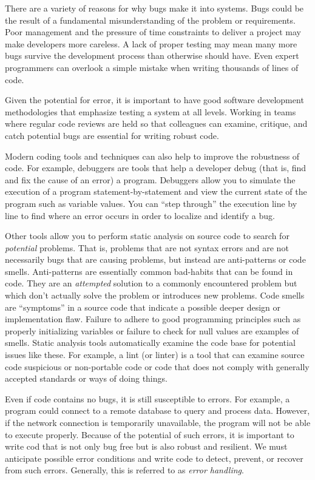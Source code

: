 There are a variety of reasons for why bugs make it into systems.
Bugs could be the result of a fundamental misunderstanding of
the problem or requirements.  Poor management and
the pressure of time constraints to deliver a project may make
developers more careless.  A lack of proper testing may mean
many more bugs survive the development process than otherwise
should have.  Even expert programmers can overlook a simple
mistake when writing thousands of lines of code.  

Given the potential for error, it is important to have good software development
methodologies that emphasize testing a system at all levels.
Working in teams where regular code reviews are held so that
colleagues can examine, critique, and catch potential bugs
are essential for writing robust code.

Modern coding tools and techniques can also help to improve
the robustness of code.  For example, 
\glspl{debugger} are 
tools that help a developer \gls{debug} (that is, find and fix
the cause of an error) a program.  Debuggers 
allow you to simulate the execution of a program statement-by-statement 
and view the current state of the program such
as variable values.  You can ``step through'' the execution
line by line to find where an error occurs in order to localize
and identify a bug.

Other tools allow you to perform \gls{static analysis} on 
source code to search for \emph{potential} problems.  
That is, problems that are not syntax errors and are not 
necessarily bugs that are causing problems, but instead 
are \glspl{anti-pattern} or \glspl{code smell}.  Anti-patterns
are essentially common bad-habits that can be found in
code.  They are an \emph{attempted} solution to a commonly
encountered problem but which don't actually solve the
problem or introduces new problems.  Code smells are 
``symptoms'' in a source code that indicate a possible
deeper design or implementation flaw.  Failure to adhere
to good programming principles such as properly initializing
variables or failure to check for null values are examples of
smells.  Static analysis tools automatically examine the
code base for potential issues like these.  For example, a
 \gls{lint} (or linter) is a tool that can examine source code 
suspicious or non-portable code or code that does not
comply with generally accepted standards or ways of 
doing things.

Even if code contains no bugs, it is still susceptible to
errors.  For example, a program could connect to a 
remote database to \gls{query} and process data.  However, if
the network connection is temporarily unavailable, the
program will not be able to execute properly.  Because
of the potential of such errors, it is important to write
cod that is not only bug free but is also robust and resilient.  We must anticipate possible 
error conditions and write code to detect, prevent, or 
recover from such errors.  Generally, this is referred to 
as \emph{error handling}.

